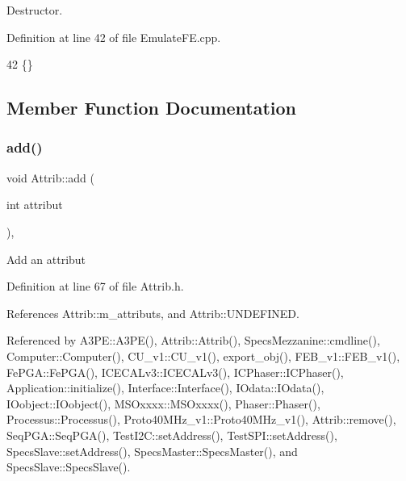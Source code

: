 Destructor. 



Definition at line 42 of file Emulate\+F\+E.\+cpp.


\begin{DoxyCode}
42 \{\}
\end{DoxyCode}


\subsection{Member Function Documentation}
\mbox{\label{classAttrib_a235f773af19c900264a190b00a3b4ad7}} 
\subsubsection{\texorpdfstring{add()}{add()}}
{\footnotesize\ttfamily void Attrib\+::add (\begin{DoxyParamCaption}\item[{int}]{attribut }\end{DoxyParamCaption})\hspace{0.3cm}{\ttfamily [inline]}, {\ttfamily [inherited]}}

Add an attribut 

Definition at line 67 of file Attrib.\+h.



References Attrib\+::m\+\_\+attributs, and Attrib\+::\+U\+N\+D\+E\+F\+I\+N\+ED.



Referenced by A3\+P\+E\+::\+A3\+P\+E(), Attrib\+::\+Attrib(), Specs\+Mezzanine\+::cmdline(), Computer\+::\+Computer(), C\+U\+\_\+v1\+::\+C\+U\+\_\+v1(), export\+\_\+obj(), F\+E\+B\+\_\+v1\+::\+F\+E\+B\+\_\+v1(), Fe\+P\+G\+A\+::\+Fe\+P\+G\+A(), I\+C\+E\+C\+A\+Lv3\+::\+I\+C\+E\+C\+A\+Lv3(), I\+C\+Phaser\+::\+I\+C\+Phaser(), Application\+::initialize(), Interface\+::\+Interface(), I\+Odata\+::\+I\+Odata(), I\+Oobject\+::\+I\+Oobject(), M\+S\+Oxxxx\+::\+M\+S\+Oxxxx(), Phaser\+::\+Phaser(), Processus\+::\+Processus(), Proto40\+M\+Hz\+\_\+v1\+::\+Proto40\+M\+Hz\+\_\+v1(), Attrib\+::remove(), Seq\+P\+G\+A\+::\+Seq\+P\+G\+A(), Test\+I2\+C\+::set\+Address(), Test\+S\+P\+I\+::set\+Address(), Specs\+Slave\+::set\+Address(), Specs\+Master\+::\+Specs\+Master(), and Specs\+Slave\+::\+Specs\+Slave().


